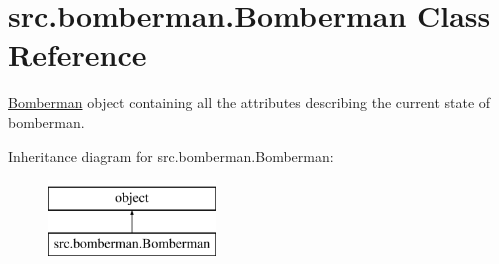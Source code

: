 \hypertarget{classsrc_1_1bomberman_1_1_bomberman}{}\section{src.\+bomberman.\+Bomberman Class Reference}
\label{classsrc_1_1bomberman_1_1_bomberman}


\hyperlink{classsrc_1_1bomberman_1_1_bomberman}{Bomberman} object containing all the attributes describing the current state of bomberman.  


Inheritance diagram for src.\+bomberman.\+Bomberman\+:\begin{figure}[H]
\begin{center}
\leavevmode
\includegraphics[height=2.000000cm]{classsrc_1_1bomberman_1_1_bomberman}
\end{center}
\end{figure}
